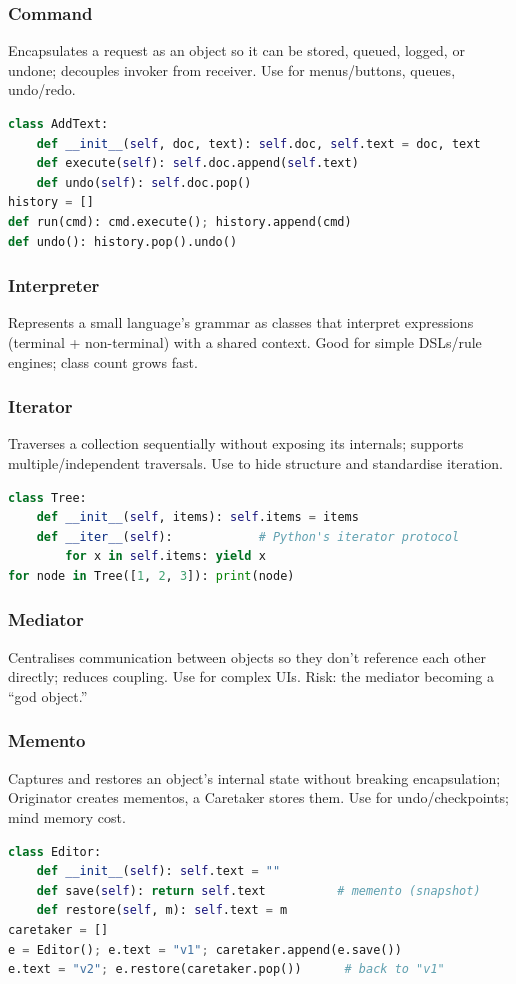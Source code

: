 \documentclass[hidelinks]{article}
\begin{document}
\subsubsection*{Command}
Encapsulates a request as an object so it can be stored, queued, logged, or undone; decouples
invoker from receiver. Use for menus/buttons, queues, undo/redo.
\begin{lstlisting}[language=Python,caption={Command with undo (added)}]
class AddText:
    def __init__(self, doc, text): self.doc, self.text = doc, text
    def execute(self): self.doc.append(self.text)
    def undo(self): self.doc.pop()
history = []
def run(cmd): cmd.execute(); history.append(cmd)
def undo(): history.pop().undo()
\end{lstlisting}

\subsubsection*{Interpreter}
Represents a small language's grammar as classes that interpret expressions (terminal +
non-terminal) with a shared context. Good for simple DSLs/rule engines; class count grows fast.

\subsubsection*{Iterator}
Traverses a collection sequentially without exposing its internals; supports multiple/independent
traversals. Use to hide structure and standardise iteration.
\begin{lstlisting}[language=Python,caption={Iterator (added)}]
class Tree:
    def __init__(self, items): self.items = items
    def __iter__(self):            # Python's iterator protocol
        for x in self.items: yield x
for node in Tree([1, 2, 3]): print(node)
\end{lstlisting}

\subsubsection*{Mediator}
Centralises communication between objects so they don't reference each other directly; reduces
coupling. Use for complex UIs. Risk: the mediator becoming a ``god object.''

\subsubsection*{Memento}
Captures and restores an object's internal state without breaking encapsulation; Originator creates
mementos, a Caretaker stores them. Use for undo/checkpoints; mind memory cost.
\begin{lstlisting}[language=Python,caption={Memento (added)}]
class Editor:
    def __init__(self): self.text = ""
    def save(self): return self.text          # memento (snapshot)
    def restore(self, m): self.text = m
caretaker = []
e = Editor(); e.text = "v1"; caretaker.append(e.save())
e.text = "v2"; e.restore(caretaker.pop())      # back to "v1"
\end{lstlisting}
\end{document}
